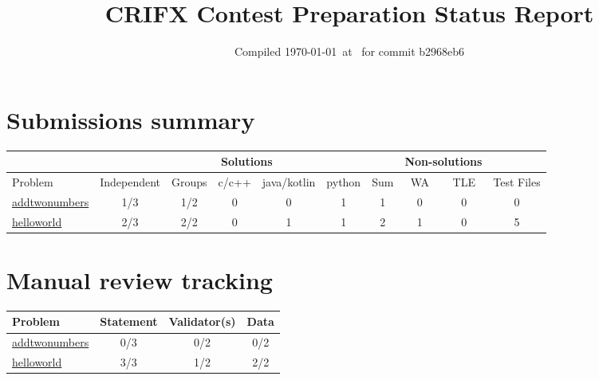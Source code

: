 \documentclass{article}%
\title{CRIFX Contest Preparation Status Report}%
\date{Compiled \today~at \DTMcurrenttime\DTMcurrentzone~for commit b2968eb6}%
\begin{document}
%
\normalsize%
\maketitle%
\section{Submissions summary}%
\label{sec:Submissionssummary}%
\begin{tabular}{|l|c|c|c|c|c|c|c|c|c|}%
\hline%
\rowcolor{cyan}%
&\multicolumn{6}{c}{{\tiny Solutions}}&\multicolumn{2}{|c|}{{\tiny Non-solutions}}&\\%
\hline%
\rowcolor{cyan}%
{\tiny Problem}&{\tiny Independent}&{\tiny Groups}&{\tiny c/c++}&{\tiny java/kotlin}&{\tiny python}&{\tiny Sum}&{\tiny WA}&{\tiny TLE}&{\tiny Test Files}\\%
\hline%
\hyperref[sec:addtwonumbers]{addtwonumbers}&\cellcolor{insufficientred}1/3&\cellcolor{insufficientred}1/2&0&0&1&1&0&0&0\\%
\hline%
\hyperref[sec:helloworld]{helloworld}&\cellcolor{insufficientred}2/3&\cellcolor{sufficientgreen}2/2&0&1&1&2&1&0&5\\%
\hline%
\end{tabular}

%
\section{Manual review tracking}%
\label{sec:Manualreviewtracking}%
\begin{tabular}{|l|c|c|c|}%
\hline%
\rowcolor{cyan}%
{\tiny Problem}&{\tiny Statement}&{\tiny Validator(s)}&{\tiny Data}\\%
\hline%
\hyperref[sec:addtwonumbers]{addtwonumbers}&\cellcolor{insufficientred}0/3&\cellcolor{insufficientred}0/2&\cellcolor{insufficientred}0/2\\%
\hline%
\hyperref[sec:helloworld]{helloworld}&\cellcolor{sufficientgreen}3/3&\cellcolor{insufficientred}1/2&\cellcolor{sufficientgreen}2/2\\%
\hline%
\end{tabular}

%
\end{document}
